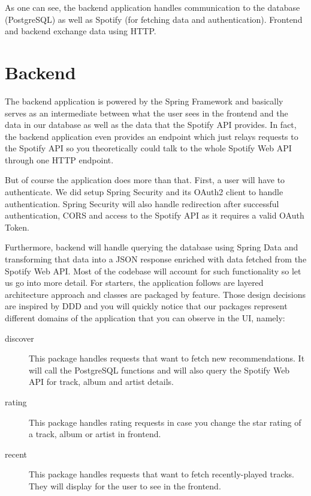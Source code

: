 As one can see, the backend application handles communication to the database (PostgreSQL) as well as Spotify (for fetching data and authentication). Frontend and backend exchange data using \ac{HTTP}.

\section{Backend}

The backend application is powered by the Spring Framework and basically serves as an intermediate between what the user sees in the frontend and the data in our database as well as the data that the Spotify API provides. In fact, the backend application even provides an endpoint which just relays requests to the Spotify API so you theoretically could talk to the whole Spotify Web API through one \ac{HTTP} endpoint.

But of course the application does more than that. First, a user will have to authenticate. We did setup Spring Security and its OAuth2 client to handle authentication. Spring Security will also handle redirection after successful authentication, \ac{CORS} and access to the Spotify API as it requires a valid OAuth Token.

Furthermore, backend will handle querying the database using Spring Data and transforming that data into a \acs{JSON} response enriched with data fetched from the Spotify Web API. Most of the codebase will account for such functionality so let us go into more detail. For starters, the application follows are layered architecture approach and classes are packaged by feature. Those design decisions are inspired by \ac{DDD} and you will quickly notice that our packages represent different domains of the application that you can observe in the \ac{UI}, namely:

\begin{description}
    \item[discover] This package handles requests that want to fetch new recommendations. It will call the PostgreSQL functions and will also query the Spotify Web API for track, album and artist details.
    \item[rating] This package handles rating requests in case you change the star rating of a track, album or artist in frontend.
    \item[recent] This package handles requests that want to fetch recently-played tracks. They will display for the user to see in the frontend.
\end{description}

